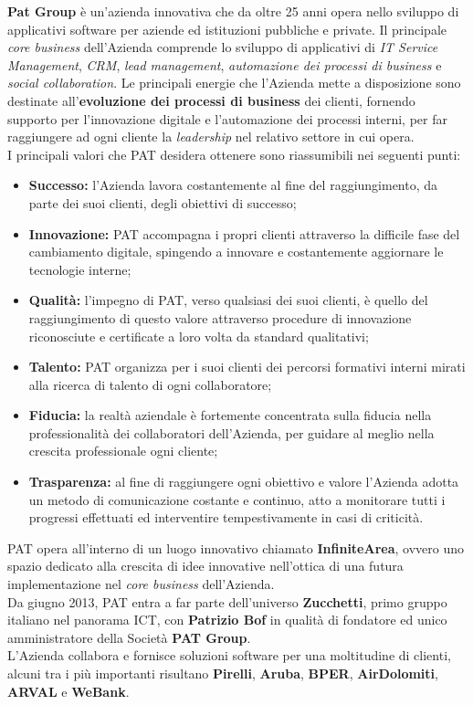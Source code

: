 \textbf{Pat Group} è un'azienda innovativa che da oltre 25 anni opera nello sviluppo di applicativi software per aziende ed istituzioni pubbliche e private. Il principale \textit{core business} dell'Azienda comprende lo sviluppo di applicativi di \textit{IT Service Management}, \textit{CRM}, \textit{lead management}, \textit{automazione dei processi di business} e \textit{social collaboration}.
Le principali energie che l'Azienda mette a disposizione sono destinate all'\textbf{evoluzione dei processi di business} dei clienti, fornendo supporto per l'innovazione digitale e l'automazione dei processi interni, per far raggiungere ad ogni cliente la \textit{leadership} nel relativo settore in cui opera.\\
I principali valori che PAT desidera ottenere sono riassumibili nei seguenti punti:
\begin{itemize}
	\item \textbf{Successo:} l'Azienda lavora costantemente al fine del raggiungimento, da parte dei suoi clienti, degli obiettivi di successo;
	\item \textbf{Innovazione:} PAT accompagna i propri clienti attraverso la difficile fase del cambiamento digitale, spingendo a innovare e costantemente aggiornare le tecnologie interne;
	\item \textbf{Qualità:} l'impegno di PAT, verso qualsiasi dei suoi clienti, è quello del raggiungimento di questo valore attraverso procedure di innovazione riconosciute e certificate a loro volta da standard qualitativi;
	\item \textbf{Talento:} PAT organizza per i suoi clienti dei percorsi formativi interni mirati alla ricerca di talento di ogni collaboratore;
	\item \textbf{Fiducia:} la realtà aziendale è fortemente concentrata sulla fiducia nella professionalità dei collaboratori dell'Azienda, per guidare al meglio nella crescita professionale ogni cliente;
	\newpage
	\item \textbf{Trasparenza:} al fine di raggiungere ogni obiettivo e valore l'Azienda adotta un metodo di comunicazione costante e continuo, atto a monitorare tutti i progressi effettuati ed interventire tempestivamente in casi di criticità.
\end{itemize}
PAT opera all'interno di un luogo innovativo chiamato \textbf{InfiniteArea}, ovvero uno spazio dedicato alla crescita di idee innovative nell'ottica di una futura implementazione nel \textit{core business} dell'Azienda. \\
Da giugno 2013, PAT entra a far parte dell'universo \textbf{Zucchetti}, primo gruppo italiano nel panorama ICT, con \textbf{Patrizio Bof} in qualità di fondatore ed unico amministratore della Società \textbf{PAT Group}.\\
L'Azienda collabora e fornisce soluzioni software per una moltitudine di clienti, alcuni tra i più importanti risultano \textbf{Pirelli}, \textbf{Aruba}, \textbf{BPER}, \textbf{AirDolomiti}, \textbf{ARVAL} e \textbf{WeBank}.
